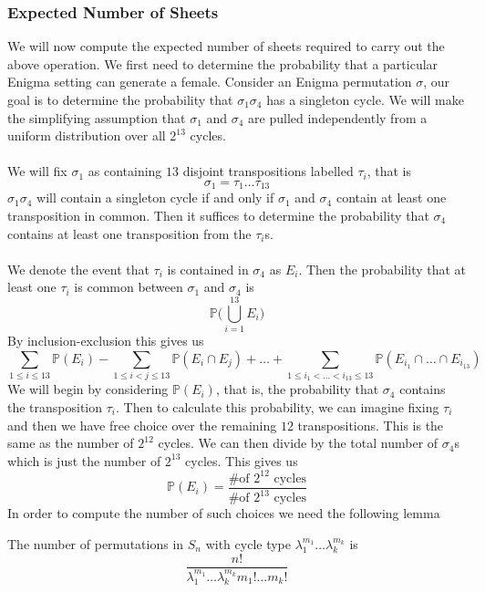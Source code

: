 \subsubsection{Expected Number of Sheets}
We will now compute the expected number of sheets required to carry
out the above operation. We first need to determine the probability
that a particular Enigma setting can generate a female. Consider an
Enigma permutation $\sigma$, our goal is to determine the probability
that $\sigma_1\sigma_4$ has a singleton cycle. We will make the
simplifying assumption that $\sigma_1$ and $\sigma_4$ are pulled
independently from a uniform distribution over all $2^{13}$ cycles.
\\\\We will fix $\sigma_1$ as containing $13$ disjoint transpositions
labelled $\tau_i$, that is
\[
	\sigma_1 = \tau_1\dots\tau_{13}
\]
$\sigma_1\sigma_4$ will contain a singleton cycle if and only if
$\sigma_1$ and $\sigma_4$ contain at least one transposition in
common. Then it suffices to determine the probability that $\sigma_4$
contains at least one transposition from the $\tau_i$s.
\\\\We denote the event that $\tau_i$ is contained in $\sigma_4$ as
$E_i$. Then the probability that at least one $\tau_i$ is common
between $\sigma_1$ and $\sigma_4$ is
\[
	\mathbb{P}\biggl(\bigcup_{i=1}^{13}E_i\biggr)
\]
By inclusion-exclusion this gives us
\[
	\sum_{1 \le i \le 13}\mathbb{P}(E_i) - \sum_{1\le i < j \le
		13}\mathbb{P}(E_i\cap E_j) + \dots + \sum_{1\le i_1 < \dots <
		i_{13} \le 13}\mathbb{P}(E_{i_1}\cap\dots\cap E_{i_{13}})
\]
We will begin by considering $\mathbb{P}(E_i)$, that is, the
probability that $\sigma_4$ contains the transposition $\tau_i$. Then
to calculate this probability, we can imagine fixing $\tau_i$ and
then we have free choice over the remaining $12$ transpositions. This
is the same as the number of $2^{12}$ cycles. We can then divide by
the total number of $\sigma_4$s which is just the number of $2^{13}$
cycles. This gives us
\[
	\mathbb{P}(E_i) = \frac{\text{\# of }2^{12}\text{ cycles}}{\text{\#
		of }2^{13}\text{ cycles}}
\]
In order to compute the number of such choices we need the following lemma
\begin{lemma}
	\label{lem:num_cycle_type}
	The number of permutations in $S_n$ with cycle type
	$\lambda_1^{m_1}\dots\lambda_k^{m_k}$ is
	\[
		\frac{n!}{\lambda_1^{m_1}\dots\lambda_k^{m_k}m_1!\dots m_k!}
	\]
\end{lemma}
